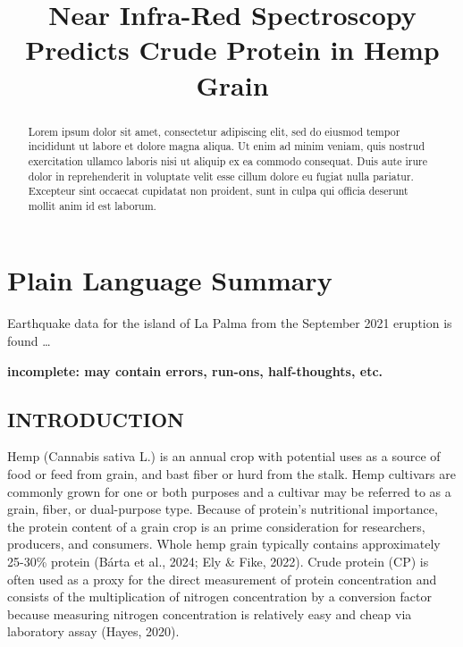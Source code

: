 \documentclass[
]{agujournal2019}
\begin{document}
\title{Near Infra-Red Spectroscopy Predicts Crude Protein in Hemp Grain}



\begin{abstract}
Lorem ipsum dolor sit amet, consectetur adipiscing elit, sed do eiusmod
tempor incididunt ut labore et dolore magna aliqua. Ut enim ad minim
veniam, quis nostrud exercitation ullamco laboris nisi ut aliquip ex ea
commodo consequat. Duis aute irure dolor in reprehenderit in voluptate
velit esse cillum dolore eu fugiat nulla pariatur. Excepteur sint
occaecat cupidatat non proident, sunt in culpa qui officia deserunt
mollit anim id est laborum.
\end{abstract}

\section*{Plain Language Summary}
Earthquake data for the island of La Palma from the September 2021
eruption is found \ldots{}



\textbf{incomplete: may contain errors, run-ons, half-thoughts, etc.}

\subsection{INTRODUCTION}\label{introduction}

Hemp (Cannabis sativa L.) is an annual crop with potential uses as a
source of food or feed from grain, and bast fiber or hurd from the
stalk. Hemp cultivars are commonly grown for one or both purposes and a
cultivar may be referred to as a grain, fiber, or dual-purpose type.
Because of protein's nutritional importance, the protein content of a
grain crop is an prime consideration for researchers, producers, and
consumers. Whole hemp grain typically contains approximately 25-30\%
protein (Bárta et al., 2024; Ely \& Fike, 2022). Crude protein (CP) is
often used as a proxy for the direct measurement of protein
concentration and consists of the multiplication of nitrogen
concentration by a conversion factor because measuring nitrogen
concentration is relatively easy and cheap via laboratory assay (Hayes,
2020).
\end{document}
